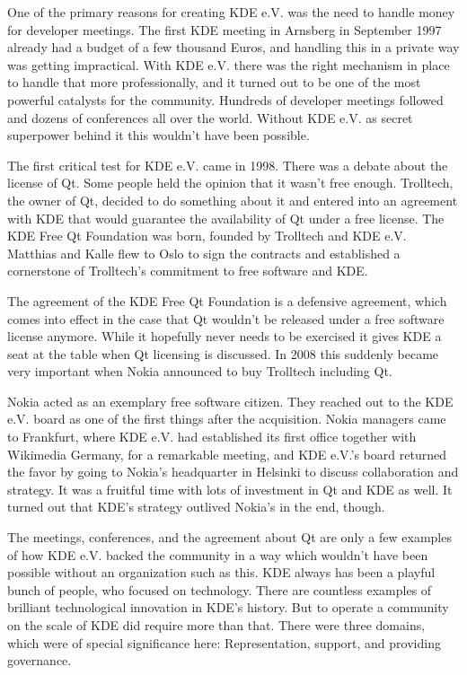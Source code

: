 One of the primary reasons for creating KDE e.V. was the need to handle money for developer meetings. The first KDE meeting in Arnsberg in September 1997 already had a budget of a few thousand Euros, and handling this in a private way was getting impractical. With KDE e.V. there was the right mechanism in place to handle that more professionally, and it turned out to be one of the most powerful catalysts for the community. Hundreds of developer meetings followed and dozens of conferences all over the world. Without KDE e.V. as secret superpower behind it this wouldn't have been possible.

The first critical test for KDE e.V. came in 1998. There was a debate about the license of Qt. Some people held the opinion that it wasn't free enough. Trolltech, the owner of Qt, decided to do something about it and entered into an agreement with KDE that would guarantee the availability of Qt under a free license. The KDE Free Qt Foundation was born, founded by Trolltech and KDE e.V. Matthias and Kalle flew to Oslo to sign the contracts and established a cornerstone of Trolltech's commitment to free software and KDE.

The agreement of the KDE Free Qt Foundation is a defensive agreement, which comes into effect in the case that Qt wouldn't be released under a free software license anymore. While it hopefully never needs to be exercised it gives KDE a seat at the table when Qt licensing is discussed. In 2008 this suddenly became very important when Nokia announced to buy Trolltech including Qt.

Nokia acted as an exemplary free software citizen. They reached out to the KDE e.V. board as one of the first things after the acquisition. Nokia managers came to Frankfurt, where KDE e.V. had established its first office together with Wikimedia Germany, for a remarkable meeting, and KDE e.V.'s board returned the favor by going to Nokia's headquarter in Helsinki to discuss collaboration and strategy. It was a fruitful time with lots of investment in Qt and KDE as well. It turned out that KDE's strategy outlived Nokia's in the end, though.

The meetings, conferences, and the agreement about Qt are only a few examples of how KDE e.V. backed the community in a way which wouldn't have been possible without an organization such as this. KDE always has been a playful bunch of people, who focused on technology. There are countless examples of brilliant technological innovation in KDE's history. But to operate a community on the scale of KDE did require more than that. There were three domains, which were of special significance here: Representation, support, and providing governance.

